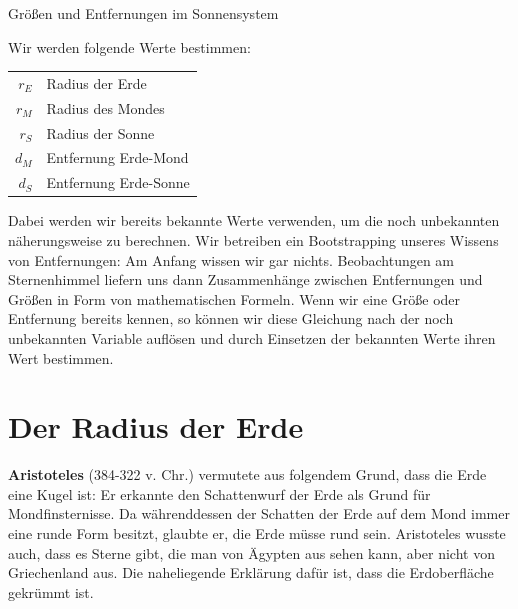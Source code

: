 \documentclass{scrartcl}
\newcommand{\RE}{r_E} %
\newcommand{\RM}{r_M} %
\newcommand{\RS}{r_S} %
\newcommand{\DM}{d_M} %
\newcommand{\DS}{d_S} %
\newcommand{\person}[1]{\textbf{#1}} %
\begin{document}

  \begin{center}
    \Huge Größen und Entfernungen im Sonnensystem \\[1em]
  \end{center}

  Wir werden folgende Werte bestimmen:

  \begin{center}
    \begin{tabular}{r l}
      $\RE$ & Radius der Erde \\
      $\RM$ & Radius des Mondes \\
      $\RS$ & Radius der Sonne \\
      $\DM$ & Entfernung Erde-Mond \\
      $\DS$ & Entfernung Erde-Sonne \\
    \end{tabular}
  \end{center}

  Dabei werden wir bereits bekannte Werte verwenden, um die noch unbekannten näherungsweise zu berechnen. Wir betreiben ein Bootstrapping unseres Wissens von Entfernungen: Am Anfang wissen wir gar nichts. Beobachtungen am Sternenhimmel liefern uns dann Zusammenhänge zwischen Entfernungen und Größen in Form von mathematischen Formeln. Wenn wir eine Größe oder Entfernung bereits kennen, so können wir diese Gleichung nach der noch unbekannten Variable auflösen und durch Einsetzen der bekannten Werte ihren Wert bestimmen.

  \newpage

  \section{Der Radius der Erde}

  \person{Aristoteles} (384-322 v. Chr.) vermutete aus folgendem Grund, dass die Erde eine Kugel ist:
  Er erkannte den Schattenwurf der Erde als Grund für Mondfinsternisse.
  Da währenddessen der Schatten der Erde auf dem Mond immer eine runde Form besitzt, glaubte er, die Erde müsse rund sein.
  Aristoteles wusste auch, dass es Sterne gibt, die man von Ägypten aus sehen kann, aber nicht von Griechenland aus. Die naheliegende Erklärung dafür ist, dass die Erdoberfläche gekrümmt ist.
\end{document}
